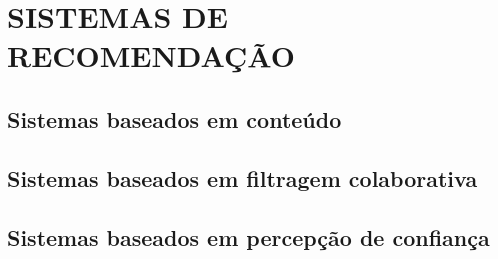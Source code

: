 \chapter{SISTEMAS DE RECOMENDAÇÃO} %
\label{cha:sistemas_de_recomendação}

\section{Sistemas baseados em conteúdo} %
\label{sec:sistemas_baseados_em_conteúdo}


\section{Sistemas baseados em filtragem colaborativa} %
\label{sec:sistemas_baseados_em_filtragem_colaborativa}


\section{Sistemas baseados em percepção de confiança} %
\label{sec:sistemas_baseados_em_percepção_de_confiança}


